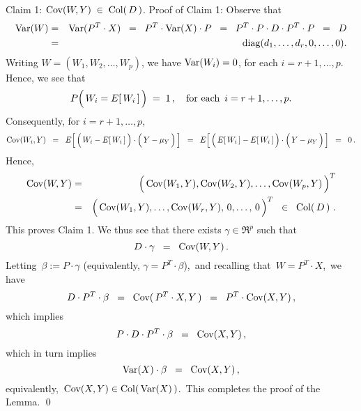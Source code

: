 \vskip 0.5cm
\noindent
\textnormal{Claim 1:}\quad
$\textnormal{Cov}(W,Y) \; \in \; \textnormal{Col}\!\left(\,D\,\right)$.
\vskip 0.2cm
\noindent
Proof of Claim 1: Observe that
\begin{eqnarray*}
\textnormal{Var}(W)
& = & \textnormal{Var}(P^{T} \cdot X)
	\;\; = \;\; P^{T} \cdot \textnormal{Var}(X) \cdot P 
	\;\; = \;\; P^{T} \cdot P \cdot D \cdot P^{T} \cdot P 
	\;\; = \;\; D
\\
& = & \textnormal{diag}(d_{1},\ldots,d_{r},0,\ldots,0).
\end{eqnarray*}
Writing $W = (W_{1},W_{2},\ldots,W_{p})$, we have
$\textnormal{Var}(W_{i}) = 0$, for each $i = r+1, \ldots, p$.
Hence, we see that
\begin{equation*}
P\!\left(\,W_{i} \overset{{\color{white}+}}{=} E\!\left[\,W_{i}\,\right]\,\right) \; = \; 1\,,
\quad
\textnormal{for each \,$i = r+1, \ldots, p$}.
\end{equation*}
Consequently, for $i = r+1,\ldots,p$,
\begin{equation*}
\Cov(W_{i},Y)
\;\; = \;\; E\!\left[\,
	\left(\,W_{i} \overset{{\color{white}.}}{-} E\!\left[\,W_{i}\,\right]\,\right)
	\cdot
	\left(\,Y \overset{{\color{white}.}}{-} \mu_{Y}\,\right)
	\,\right]
\;\; = \;\; E\!\left[\,
	\left(\,E\!\left[\,W_{i}\,\right] \overset{{\color{white}.}}{-} E\!\left[\,W_{i}\,\right]\,\right)
	\cdot
	\left(\,Y \overset{{\color{white}.}}{-} \mu_{Y}\,\right)
	\,\right]
\;\; = \;\;
	0\,.
\end{equation*}
Hence,
\begin{eqnarray*}
\Cov(W,Y)
& = & \left(\,\Cov(W_{1},\overset{{\color{white}.}}{Y}),\Cov(W_{2},Y),\ldots,\Cov(W_{p},Y)\,\right)^{T}
\\
& = & \left(\,\Cov(W_{1},\overset{{\color{white}.}}{Y}),\ldots,\Cov(W_{r},Y),\,0,\ldots,\,0\,\right)^{T}
\;\; \in \;\; \Col\!\left(\,D\,\right)\,.
\end{eqnarray*}
This proves Claim 1.
We thus see that there exists $\gamma \in \Re^{p}$ such that
\begin{equation*}
D \cdot \gamma \;\; =\;\; \textnormal{Cov}(W,Y)\,.
\end{equation*}
Letting \,$\beta := P \cdot \gamma$ (equivalently, $\gamma = P^{T} \cdot \beta$),\, and
recalling that \,$W = P^{T} \cdot X$,\, we have
\begin{equation*}
D \cdot P^{T} \cdot \beta
\;\; =\;\; \textnormal{Cov}(\,P^{T} \cdot X,Y\,)
\;\; =\;\; P^{T} \cdot \textnormal{Cov}(X,Y)\,,
\end{equation*}
which implies
\begin{equation*}
P \cdot D \cdot P^{T} \cdot \beta
\;\; =\;\; \textnormal{Cov}(X,Y)\,,
\end{equation*}
which in turn implies
\begin{equation*}
\textnormal{Var}(X) \cdot \beta
\;\; =\;\; \textnormal{Cov}(X,Y)\,,
\end{equation*}
equivalently, \,$\textnormal{Cov}(X,Y) \in \textnormal{Col}(\,\textnormal{Var}(X)\,)$.\,
This completes the proof of the Lemma.
\qed

